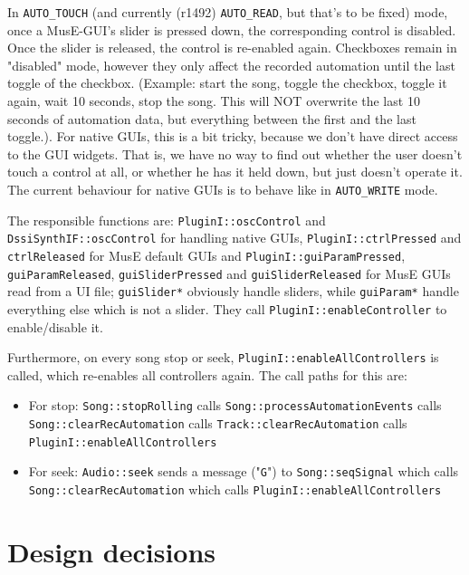 \documentclass[a4paper]{report}
\newcommand{\sym}[1]{\texttt{#1}}
\begin{document}
In \sym{AUTO\_TOUCH} (and currently (r1492) \sym{AUTO\_READ}, but
that's to be fixed) mode, once a MusE-GUI's slider is pressed down, the
corresponding control is disabled. Once the slider is released, the
control is re-enabled again. Checkboxes remain in "disabled" mode,
however they only affect the recorded automation until the last toggle
of the checkbox. (Example: start the song, toggle the checkbox, toggle
it again, wait 10 seconds, stop the song. This will NOT overwrite the
last 10 seconds of automation data, but everything between the first
and the last toggle.). For native GUIs, this is a bit tricky, because
we don't have direct access to the GUI widgets. That is, we have no
way to find out whether the user doesn't touch a control at all, or
whether he has it held down, but just doesn't operate it. The current
behaviour for native GUIs is to behave like in \sym{AUTO\_WRITE} mode.

The responsible functions are: \sym{PluginI::oscControl} and
\sym{DssiSynthIF::oscControl} for handling native GUIs,
\sym{PluginI::ctrlPressed} and \sym{ctrlReleased} for MusE
default GUIs and \sym{PluginI::guiParamPressed},
\sym{guiParamReleased}, \sym{guiSliderPressed} and
\sym{guiSliderReleased} for MusE GUIs read from a UI file;
\sym{guiSlider*} obviously handle sliders, while \sym{guiParam*}
handle everything else which is not a slider. They call
\sym{PluginI::enableController} to enable/disable it.

Furthermore, on every song stop or seek, \sym{PluginI::enableAllControllers}
is called, which re-enables all controllers again. The call paths for
this are:
\begin{itemize}
\item For stop: \sym{Song::stopRolling} calls
                \sym{Song::processAutomationEvents} calls
                \sym{Song::clearRecAutomation} calls
                \sym{Track::clearRecAutomation} calls
                \sym{PluginI::enableAllControllers}
\item For seek: \sym{Audio::seek} sends a message ("\sym{G}") to
                \sym{Song::seqSignal} which calls
                \sym{Song::clearRecAutomation} which calls
                \sym{PluginI::enableAllControllers}                
\end{itemize}




\chapter{Design decisions}
\end{document}
